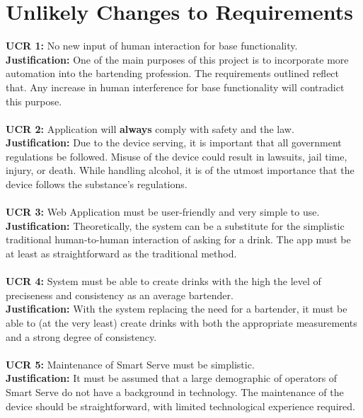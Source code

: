 \documentclass{article}
\begin{document}
\section{Unlikely Changes to Requirements}
    \noindent\textbf{UCR 1:} No new input of human interaction for base functionality. \\

    \noindent\textbf{Justification: }One of the main purposes of this project is to incorporate more automation into the bartending profession. The requirements outlined reflect that. Any increase in human interference for base functionality will contradict this purpose. \\\\
    \noindent\textbf{UCR 2:} Application will \textbf{always} comply with safety and the law. \\

    \noindent\textbf{Justification: }Due to the device serving, it is important that all government regulations be followed. Misuse of the device could result in lawsuits, jail time, injury, or death. While handling alcohol, it is of the utmost importance that the device follows  the substance's regulations.\\\\
    \noindent\textbf{UCR 3:} Web Application must be user-friendly and very simple to use.  \\

    \noindent\textbf{Justification: }Theoretically, the system can be a substitute for the simplistic traditional human-to-human interaction of asking for a drink. The app must be at least as straightforward as the traditional method.\\\\

    \noindent\textbf{UCR 4:} System must be able to create drinks with the high the level of preciseness and consistency as an average bartender.  \\

    \noindent\textbf{Justification: }With  the system replacing the need for a bartender, it must be able to (at the very least) create drinks with both the appropriate measurements and a strong degree of consistency.\\\\
    \noindent\textbf{UCR 5:} Maintenance of Smart Serve must be simplistic.  \\

    \noindent\textbf{Justification: }It must be assumed that a large demographic of operators of Smart Serve do not have a background in technology. The maintenance of the device should be straightforward, with limited technological experience required. 
\end{document}
